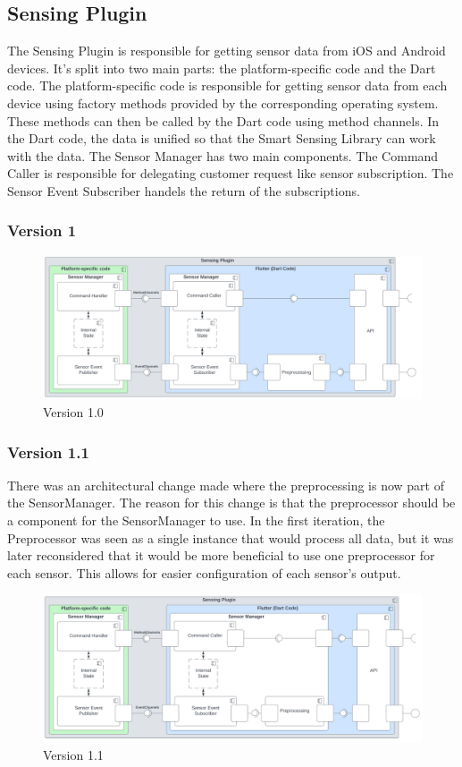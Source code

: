 \documentclass[12pt]{article}
\newcounter{fr}
\begin{document}
\subsection{Sensing Plugin}
The Sensing Plugin is responsible for getting sensor data from iOS and Android devices. It's split into two main parts: the platform-specific code and the Dart code. The platform-specific code is responsible for getting sensor data from each device using factory methods provided by the corresponding operating system. These methods can then be called by the Dart code using method channels. In the Dart code, the data is unified so that the Smart Sensing Library can work with the data. The Sensor Manager has two main components. The Command Caller is responsible for delegating customer request like sensor subscription. The Sensor Event Subscriber handels the return of the subscriptions.
\subsubsection{Version 1}
\begin{figure}[ht]
\includegraphics[width=1\textwidth]{Graphics/SmartSensingPluginOld.png}
\caption{\label{fig:bild3} Version 1.0}
\end{figure}

\subsubsection{Version 1.1}
There was an architectural change made where the preprocessing is now part of the SensorManager. The reason for this change is that the preprocessor should be a component for the SensorManager to use. In the first iteration, the Preprocessor was seen as a single instance that would process all data, but it was later reconsidered that it would be more beneficial to use one preprocessor for each sensor. This allows for easier configuration of each sensor's output.
\begin{figure}[ht]
\includegraphics[width=1\textwidth]{Graphics/SmartSensingPluginNew.png}
\caption{\label{fig:bild4} Version 1.1}
\end{figure}
\end{document}
